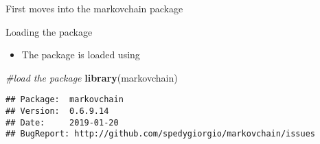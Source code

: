 \documentclass[ignorenonframetext,]{beamer}
\newenvironment{Shaded}{\begin{snugshade}}{\end{snugshade}}
\newcommand{\CommentTok}[1]{\textcolor[rgb]{0.56,0.35,0.01}{\textit{#1}}}
\newcommand{\KeywordTok}[1]{\textcolor[rgb]{0.13,0.29,0.53}{\textbf{#1}}}
\newcommand{\NormalTok}[1]{#1}
\providecommand{\tightlist}{%
  \setlength{\itemsep}{0pt}\setlength{\parskip}{0pt}}
\providecommand{\tightlist}{
  \setlength{\itemsep}{0pt}\setlength{\parskip}{0pt}
}
\begin{document}
\begin{frame}[fragile]{First moves into the markovchain package}
\protect\hypertarget{first-moves-into-the-markovchain-package}{}

\begin{block}{Loading the package}

\begin{itemize}
\tightlist
\item
  The package is loaded using
\end{itemize}

\begin{Shaded}
\begin{Highlighting}[]
\CommentTok{#load the package}
\KeywordTok{library}\NormalTok{(markovchain) }
\end{Highlighting}
\end{Shaded}

\begin{verbatim}
## Package:  markovchain
## Version:  0.6.9.14
## Date:     2019-01-20
## BugReport: http://github.com/spedygiorgio/markovchain/issues
\end{verbatim}

\end{block}

\end{frame}
\end{document}
